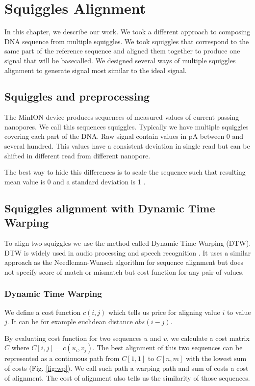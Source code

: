 \chapter{Squiggles Alignment}

\label{kap:squiggles} %

In this chapter, we describe our work. We took a different approach to composing DNA sequence from multiple squiggles. 
We took squiggles that correspond to the same part of the reference sequence and aligned them together to produce one signal that will be basecalled. We designed several ways of multiple squiggles alignment to generate signal most similar to the ideal signal.

\section{Squiggles and preprocessing}

The MinION device produces sequences of measured values of current passing nanopores. We call this sequences squiggles.
Typically we have multiple squiggles covering each part of the DNA. Raw signal contain values in pA between $0$ and several hundred. 
This values have a consistent deviation in single read but can be shifted in different read from different nanopore. 

The best way to hide this differences is to scale the sequence such that resulting mean value is 0 and a standard deviation is 1 
\cite{kubo}.

\section{Squiggles alignment with Dynamic Time Warping}
To align two squiggles we use the method called Dynamic Time Warping (DTW).
DTW is widely used in audio processing and speech recognition \cite{muller2007dynamic}.
It uses a similar approach as the Needleman-Wunsch algorithm for sequence alignment but 
does not specify score of match or mismatch but cost function for any pair of values.

\subsection{Dynamic Time Warping}

We define a cost function $c(i,j)$ which tells us price for aligning value $i$ to value $j$. 
It can be for example euclidean distance $abs(i-j)$.

By evaluating cost function for two sequences $u$ and $v$, we calculate a cost matrix $C$ where $C[i,j] = c(u_i,v_j)$.
The best alignment of this two sequences can be represented as a continuous path from $C[1,1]$ to $C[n,m]$ with the lowest sum of costs (Fig. \ref{fig:wp}). 
We call such path a warping path and sum of costs a cost of alignment. The cost of alignment also tells us the similarity of those sequences.


